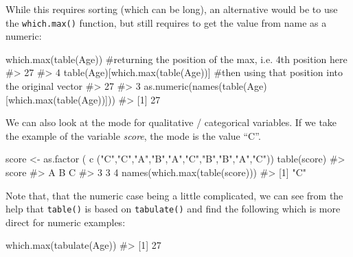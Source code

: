 \documentclass[
  letterpaper,
  DIV=11,
  numbers=noendperiod]{scrreprt}
\newenvironment{Shaded}{\begin{snugshade}}{\end{snugshade}}
\newcommand{\CommentTok}[1]{\textcolor[rgb]{0.37,0.37,0.37}{#1}}
\newcommand{\FunctionTok}[1]{\textcolor[rgb]{0.28,0.35,0.67}{#1}}
\newcommand{\NormalTok}[1]{\textcolor[rgb]{0.00,0.23,0.31}{#1}}
\newcommand{\OtherTok}[1]{\textcolor[rgb]{0.00,0.23,0.31}{#1}}
\newcommand{\StringTok}[1]{\textcolor[rgb]{0.13,0.47,0.30}{#1}}
\begin{document}
While this requires sorting (which can be long), an alternative would be
to use the \texttt{which.max()} function, but still requires to get the
value from name as a numeric:

\begin{Shaded}
\begin{Highlighting}[]
\FunctionTok{which.max}\NormalTok{(}\FunctionTok{table}\NormalTok{(Age)) }\CommentTok{\#returning the position of the max, i.e. 4th position here}
\CommentTok{\#\textgreater{} 27 }
\CommentTok{\#\textgreater{}  4}
\FunctionTok{table}\NormalTok{(Age)[}\FunctionTok{which.max}\NormalTok{(}\FunctionTok{table}\NormalTok{(Age))] }\CommentTok{\#then using that position into the original vector}
\CommentTok{\#\textgreater{} 27 }
\CommentTok{\#\textgreater{}  3}
\FunctionTok{as.numeric}\NormalTok{(}\FunctionTok{names}\NormalTok{(}\FunctionTok{table}\NormalTok{(Age)[}\FunctionTok{which.max}\NormalTok{(}\FunctionTok{table}\NormalTok{(Age))]))}
\CommentTok{\#\textgreater{} [1] 27}
\end{Highlighting}
\end{Shaded}

We can also look at the mode for qualitative / categorical variables. If
we take the example of the variable \emph{score}, the mode is the value
``C''.

\begin{Shaded}
\begin{Highlighting}[]
\NormalTok{score }\OtherTok{\textless{}{-}} \FunctionTok{as.factor}\NormalTok{ ( }\FunctionTok{c}\NormalTok{ (}\StringTok{"C"}\NormalTok{,}\StringTok{"C"}\NormalTok{,}\StringTok{"A"}\NormalTok{,}\StringTok{"B"}\NormalTok{,}\StringTok{"A"}\NormalTok{,}\StringTok{"C"}\NormalTok{,}\StringTok{"B"}\NormalTok{,}\StringTok{"B"}\NormalTok{,}\StringTok{"A"}\NormalTok{,}\StringTok{"C"}\NormalTok{))}
\FunctionTok{table}\NormalTok{(score)}
\CommentTok{\#\textgreater{} score}
\CommentTok{\#\textgreater{} A B C }
\CommentTok{\#\textgreater{} 3 3 4}
\FunctionTok{names}\NormalTok{(}\FunctionTok{which.max}\NormalTok{(}\FunctionTok{table}\NormalTok{(score)))}
\CommentTok{\#\textgreater{} [1] "C"}
\end{Highlighting}
\end{Shaded}

Note that, that the numeric case being a little complicated, we can see
from the help that \texttt{table()} is based on \texttt{tabulate()} and
find the following which is more direct for numeric examples:

\begin{Shaded}
\begin{Highlighting}[]
\FunctionTok{which.max}\NormalTok{(}\FunctionTok{tabulate}\NormalTok{(Age))}
\CommentTok{\#\textgreater{} [1] 27}
\end{Highlighting}
\end{Shaded}
\end{document}
